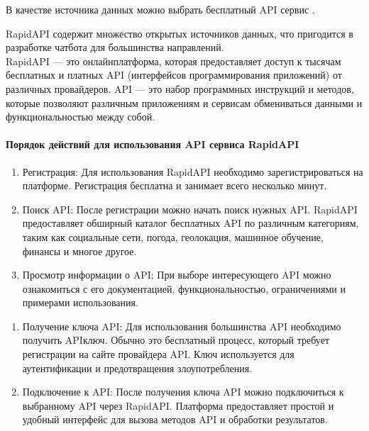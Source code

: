 \documentclass[letterpaper,10pt,russian]{sphinxmanual}
\begin{document}
\sphinxAtStartPar
В качестве источника данных можно выбрать бесплатный API сервис .

\sphinxAtStartPar
RapidAPI содержит множество открытых источников данных, что пригодится в разработке чат\sphinxhyphen{}бота для большинства направлений.\\
RapidAPI — это онлайн\sphinxhyphen{}платформа, которая предоставляет доступ к тысячам бесплатных и платных API (интерфейсов программирования приложений) от различных провайдеров. API — это набор программных инструкций и методов, которые позволяют различным приложениям и сервисам обмениваться данными и функциональностью между собой.


\paragraph{Порядок действий для использования API сервиса RapidAPI}
\label{\detokenize{educational_materials/uml/content:api-rapidapi}}\begin{enumerate}
%
\item {} 
\sphinxAtStartPar
Регистрация: Для использования RapidAPI необходимо зарегистрироваться на платформе. Регистрация бесплатна и занимает всего несколько минут.

\item {} 
\sphinxAtStartPar
Поиск API: После регистрации можно начать поиск нужных API. RapidAPI предоставляет обширный каталог бесплатных API по различным категориям, таким как социальные сети, погода, геолокация, машинное обучение, финансы и многое другое.

\item {} 
\sphinxAtStartPar
Просмотр информации о API: При выборе интересующего API можно ознакомиться с его документацией, функциональностью, ограничениями и примерами использования.

\end{enumerate}

\sphinxAtStartPar
{}
\begin{enumerate}
%
\setcounter{enumi}{3}
\item {} 
\sphinxAtStartPar
Получение ключа API: Для использования большинства API необходимо получить API\sphinxhyphen{}ключ. Обычно это бесплатный процесс, который требует регистрации на сайте провайдера API. Ключ используется для аутентификации и предотвращения злоупотребления.

\item {} 
\sphinxAtStartPar
Подключение к API: После получения ключа API можно подключиться к выбранному API через RapidAPI. Платформа предоставляет простой и удобный интерфейс для вызова методов API и обработки результатов.

\end{enumerate}
\end{document}
